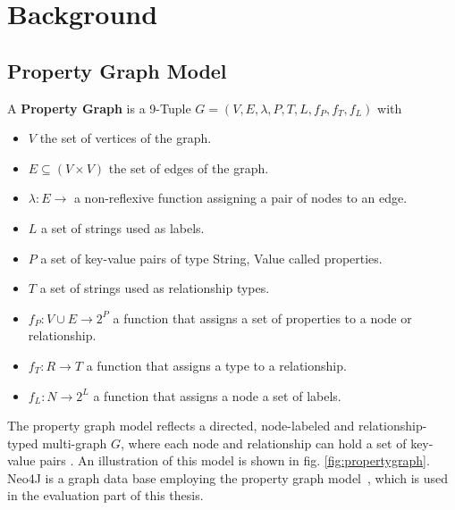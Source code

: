 \chapter{Background}\label{\positionnumber} 

\section{Property Graph Model}\label{\positionnumber}
A \textbf{Property Graph} is a 9-Tuple $G = (V, E, \lambda, P, T, L, f_P, f_T, f_L)$ with 
\begin{itemize}
    \item $V$ the set of vertices of the graph.
    \item $E \subseteq (V \times V)$ the set of edges of the graph.
    \item $\lambda: E \rightarrow $ a non-reflexive
 function assigning a pair of nodes to an edge.
    \item $L$ a set of strings used as labels.
    \item $P$ a set of key-value pairs of type String, Value called properties.
    \item $T$ a set of strings used as relationship types.
    \item $f_P: V \cup E \rightarrow 2^P$ a function that assigns a set of properties to a node or relationship.
   \item $f_T: R \rightarrow T$ a function that assigns a type to  a relationship.
   \item  $f_L: N \rightarrow 2^L$ a function that assigns a node a set of labels.
\end{itemize} 
\smallskip
The property graph model reflects a directed, node-labeled and relationship-typed multi-graph $G$, where each node and relationship can hold a set of key-value pairs \cite{angles2018property}. An illustration of this model is shown in fig. \ref{fig:propertygraph}.
Neo4J is a graph data base employing the property graph model~\cite{neo4j_book}, which is used in the evaluation part of this thesis.


